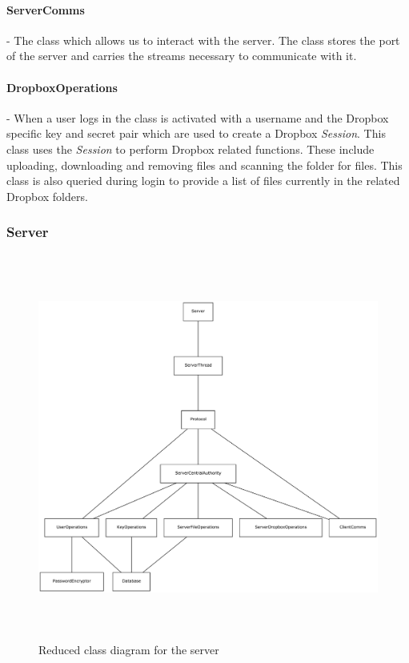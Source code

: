 \documentclass[12pt, titlepage]{article}
\begin{document}
\paragraph*{ServerComms} - The class which allows us to interact with the server. The class stores the port of the server and carries the streams necessary to communicate with it.
\paragraph*{DropboxOperations} - When a user logs in the class is activated with a username and the Dropbox specific key and secret pair which are used to create a Dropbox \textit{Session}. This class uses the \textit{Session} to perform Dropbox related functions. These include uploading, downloading and removing files and  scanning the folder for files. This class is also queried during login to provide a list of files currently in the related Dropbox folders.

\subsubsection{Server}

\begin{figure}
\centerline{\includegraphics[height=5.0in,width=8in,angle=0]{server-classDiagram.pdf}}
\caption{Reduced class diagram for the server}
\label{fig:reducedServerClass}
\end{figure}
\end{document}
